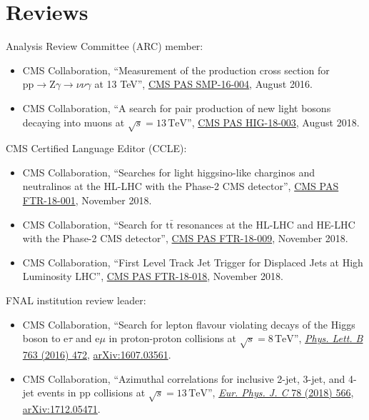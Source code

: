 \section{Reviews}
Analysis Review Committee (ARC) member:
\begin{itemize}[leftmargin=12pt]
\item CMS Collaboration, ``Measurement of the production cross section for $\text{p}\text{p} \to \text{Z}\gamma \to \nu\nu\gamma$ at 13 TeV'', \href{https://cds.cern.ch/record/2204922}{CMS PAS SMP-16-004}, August 2016.
\item CMS Collaboration, ``A search for pair production of new light bosons decaying into muons at $\sqrt{s} = 13\,\text{TeV}$'', \href{https://cds.cern.ch/record/2632275}{CMS PAS HIG-18-003}, August 2018.
\end{itemize}
CMS Certified Language Editor (CCLE):
\begin{itemize}[leftmargin=12pt]
\item CMS Collaboration, ``Searches for light higgsino-like charginos and neutralinos at the HL-LHC with the Phase-2 CMS detector'', \href{https://cds.cern.ch/record/2648538}{CMS PAS FTR-18-001}, November 2018.
\item CMS Collaboration, ``Search for $\text{t}\bar{\text{t}}$ resonances at the HL-LHC and HE-LHC with the Phase-2 CMS detector'', \href{https://cds.cern.ch/record/2649032}{CMS PAS FTR-18-009}, November 2018.
\item CMS Collaboration, ``First Level Track Jet Trigger for Displaced Jets at High Luminosity LHC'', \href{https://cds.cern.ch/record/2647987}{CMS PAS FTR-18-018}, November 2018.
\end{itemize}
FNAL institution review leader:
\begin{itemize}[leftmargin=12pt]
\item CMS Collaboration, ``Search for lepton flavour violating decays of the Higgs boson to e$\tau$ and e$\mu$ in proton-proton collisions at $\sqrt{s} = 8\,\text{TeV}$'', \href{http://dx.doi.org/10.1016/j.physletb.2016.09.062}{\emph{Phys. Lett. B} 763 (2016) 472}, \href{http://arxiv.org/abs/1607.03561}{arXiv:1607.03561}.
\item CMS Collaboration, ``Azimuthal correlations for inclusive 2-jet, 3-jet, and 4-jet events in pp collisions at $\sqrt{s} = 13\,\text{TeV}$'', \href{http://dx.doi.org/10.1140/epjc/s10052-018-6033-4}{\emph{Eur. Phys. J. C} 78 (2018) 566}, \href{http://arxiv.org/abs/1712.05471}{arXiv:1712.05471}.
\end{itemize}